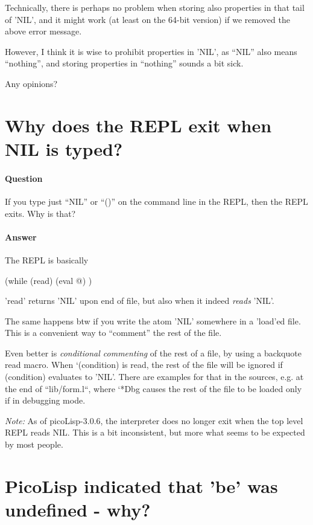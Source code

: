Technically, there is perhaps no problem when storing also properties in that
tail of 'NIL', and it might work (at least on the 64-bit version) if we removed
the above error message.

However, I think it is wise to prohibit properties in 'NIL', as ``NIL'' also means
``nothing'', and storing properties in ``nothing'' sounds a bit sick.

Any opinions?

\section{Why does the REPL exit when \textbf{NIL} is typed?}
\label{sec:fsl}


\paragraph{Question}
\label{sec:dfs}

If you type just ``NIL'' or ``()'' on the command line in the REPL,
then the REPL exits. Why is that?


\paragraph{Answer}
\label{sec:dfs}

The REPL is basically

\begin{wideverbatim}
   (while (read)
      (eval @) )
\end{wideverbatim}

'read' returns 'NIL' upon end of file, but also when it indeed \textit{reads} 'NIL'.

The same happens btw if you write the atom 'NIL' somewhere in a 'load'ed file.
This is a convenient way to ``comment'' the rest of the file.

Even better is \textit{conditional commenting} of the rest of a file, by using
a backquote read macro. When `(condition) is read, the rest of the file
will be ignored if (condition) evaluates to 'NIL'. There are examples
for that in the sources, e.g. at the end of ``lib/form.l``, where `*Dbg causes
the rest of the file to be loaded only if in debugging mode.

\emph{Note:} As of picoLisp-3.0.6, the interpreter does no longer exit
when the top level REPL reads NIL. This is a bit inconsistent, but
more what seems to be expected by most people.


\section{PicoLisp indicated that 'be' was undefined - why?}
\label{sec:dsfs}

